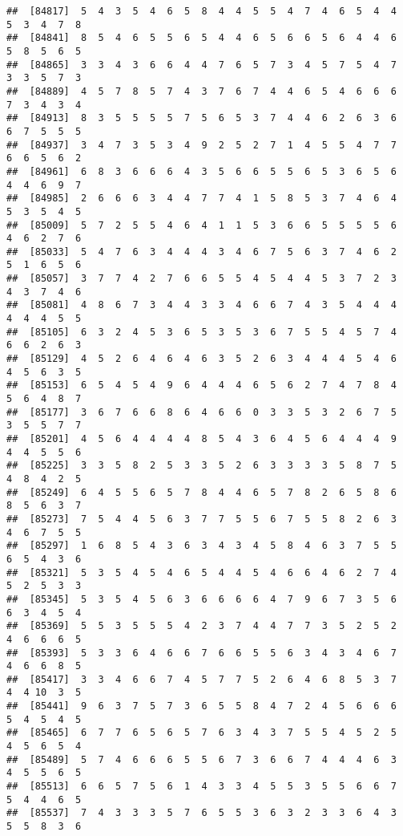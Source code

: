 \documentclass[
]{book}
\begin{document}
\begin{verbatim}
##  [84817]  5  4  3  5  4  6  5  8  4  4  5  5  4  7  4  6  5  4  4  5  3  4  7  8
##  [84841]  8  5  4  6  5  5  6  5  4  4  6  5  6  6  5  6  4  4  6  5  8  5  6  5
##  [84865]  3  3  4  3  6  6  4  4  7  6  5  7  3  4  5  7  5  4  7  3  3  5  7  3
##  [84889]  4  5  7  8  5  7  4  3  7  6  7  4  4  6  5  4  6  6  6  7  3  4  3  4
##  [84913]  8  3  5  5  5  5  7  5  6  5  3  7  4  4  6  2  6  3  6  6  7  5  5  5
##  [84937]  3  4  7  3  5  3  4  9  2  5  2  7  1  4  5  5  4  7  7  6  6  5  6  2
##  [84961]  6  8  3  6  6  6  4  3  5  6  6  5  5  6  5  3  6  5  6  4  4  6  9  7
##  [84985]  2  6  6  6  3  4  4  7  7  4  1  5  8  5  3  7  4  6  4  5  3  5  4  5
##  [85009]  5  7  2  5  5  4  6  4  1  1  5  3  6  6  5  5  5  5  6  4  6  2  7  6
##  [85033]  5  4  7  6  3  4  4  4  3  4  6  7  5  6  3  7  4  6  2  5  1  6  5  6
##  [85057]  3  7  7  4  2  7  6  6  5  5  4  5  4  4  5  3  7  2  3  4  3  7  4  6
##  [85081]  4  8  6  7  3  4  4  3  3  4  6  6  7  4  3  5  4  4  4  4  4  4  5  5
##  [85105]  6  3  2  4  5  3  6  5  3  5  3  6  7  5  5  4  5  7  4  6  6  2  6  3
##  [85129]  4  5  2  6  4  6  4  6  3  5  2  6  3  4  4  4  5  4  6  4  5  6  3  5
##  [85153]  6  5  4  5  4  9  6  4  4  4  6  5  6  2  7  4  7  8  4  5  6  4  8  7
##  [85177]  3  6  7  6  6  8  6  4  6  6  0  3  3  5  3  2  6  7  5  3  5  5  7  7
##  [85201]  4  5  6  4  4  4  4  8  5  4  3  6  4  5  6  4  4  4  9  4  4  5  5  6
##  [85225]  3  3  5  8  2  5  3  3  5  2  6  3  3  3  3  5  8  7  5  4  8  4  2  5
##  [85249]  6  4  5  5  6  5  7  8  4  4  6  5  7  8  2  6  5  8  6  8  5  6  3  7
##  [85273]  7  5  4  4  5  6  3  7  7  5  5  6  7  5  5  8  2  6  3  4  6  7  5  5
##  [85297]  1  6  8  5  4  3  6  3  4  3  4  5  8  4  6  3  7  5  5  6  5  4  3  6
##  [85321]  5  3  5  4  5  4  6  5  4  4  5  4  6  6  4  6  2  7  4  5  2  5  3  3
##  [85345]  5  3  5  4  5  6  3  6  6  6  6  4  7  9  6  7  3  5  6  6  3  4  5  4
##  [85369]  5  5  3  5  5  5  4  2  3  7  4  4  7  7  3  5  2  5  2  4  6  6  6  5
##  [85393]  5  3  3  6  4  6  6  7  6  6  5  5  6  3  4  3  4  6  7  4  6  6  8  5
##  [85417]  3  3  4  6  6  7  4  5  7  7  5  2  6  4  6  8  5  3  7  4  4 10  3  5
##  [85441]  9  6  3  7  5  7  3  6  5  5  8  4  7  2  4  5  6  6  6  5  4  5  4  5
##  [85465]  6  7  7  6  5  6  5  7  6  3  4  3  7  5  5  4  5  2  5  4  5  6  5  4
##  [85489]  5  7  4  6  6  6  5  5  6  7  3  6  6  7  4  4  4  6  3  4  5  5  6  5
##  [85513]  6  6  5  7  5  6  1  4  3  3  4  5  5  3  5  5  6  6  7  5  4  4  6  5
##  [85537]  7  4  3  3  3  5  7  6  5  5  3  6  3  2  3  3  6  4  3  5  5  8  3  6

\end{verbatim}
\end{document}
